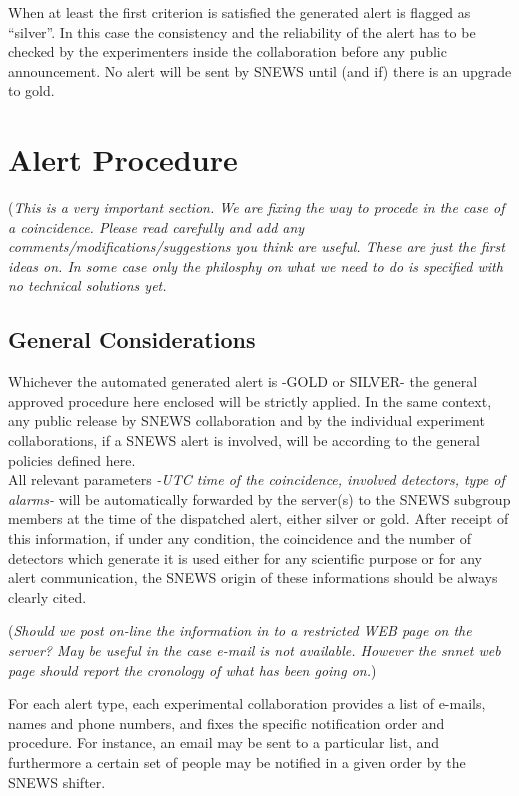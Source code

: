 \documentclass{article}
\begin{document}
When at least the first criterion is satisfied the generated alert is
flagged as ``silver''. In this case the consistency and the reliability 
of the alert has to be checked by the experimenters inside the collaboration before any public announcement. No alert will be sent by SNEWS until (and if)
there is an upgrade to gold.

\section{Alert Procedure}
({\it This is a very important section. We are fixing the way to procede
in the case of a coincidence. Please read carefully and add any 
comments/modifications/suggestions you think are useful. These are 
just the first ideas on. In some case  only the philosphy on what we need 
to do is specified with no technical solutions yet.}\\

\subsection{General Considerations}

Whichever the automated generated alert is -GOLD or SILVER- the
general approved procedure here enclosed will be strictly applied. In
the same context, any public release by SNEWS collaboration and by the
individual experiment collaborations, if a SNEWS alert is involved,
will be according to the general policies defined here.\\


All relevant parameters {\it -UTC
time of the coincidence, involved detectors, type of alarms-} will be
automatically forwarded by the server(s) to the SNEWS subgroup members
at the time of the dispatched alert, either silver or gold.
After receipt of this information, if under any condition,
the coincidence and the number of detectors which generate 
it is used either for any scientific purpose or for any alert
communication, the SNEWS origin of these informations
should be always clearly cited.

({\it Should we post on-line the information in to a 
restricted WEB page on the server? May be useful in the case e-mail is not available. 
However the snnet web page should report the cronology of what has been going on.})

For each alert type, each experimental collaboration 
provides a list of e-mails, names and phone numbers, and fixes
the specific
notification order and procedure. For instance, an email may
be sent to a particular list, and furthermore a certain set of
people may be notified in a given order by the SNEWS shifter.
\end{document}
